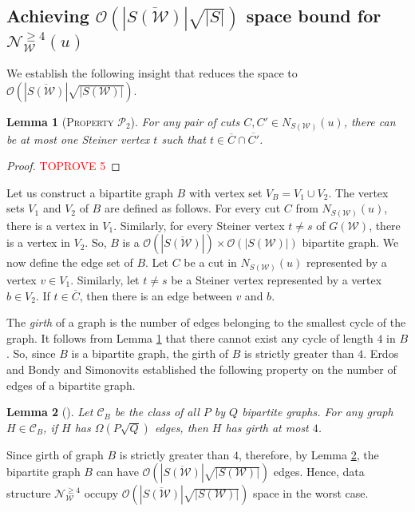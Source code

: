\documentclass[letterpaper,11pt]{article}
\newtheorem{lemma}{Lemma}[]
\begin{document}
\subsection{Achieving ${\mathcal O}(|\overline{S({\mathcal W})}|\sqrt{|S|})$ space bound for ${\mathcal N}_{\mathcal W}^{\ge 4}(u)$} \label{app : root S bound} 
We establish the following insight that reduces the space to ${\mathcal O}(|\overline{S({\mathcal W})}|\sqrt{|S({\mathcal W})|})$. 
\begin{lemma} [\textsc{Property ${\mathcal P}_2$}] \label{lem : at most one bunch in common}
    For any pair of cuts $C,C'\in N_{S({\mathcal W})}(u)$, there can be at most one Steiner vertex $t$ such that $t\in \overline{C} \cap \overline{C'}$.
\end{lemma}
\begin{proof}\textcolor{red}{TOPROVE 5}\end{proof}
Let us construct a bipartite graph $B$ with vertex set $V_B=V_1 \cup V_2$. The vertex sets $V_1$ and $V_2$ of $B$ are defined as follows. For every cut $C$ from $N_{S({\mathcal W})}(u)$, there is a vertex in $V_1$. Similarly, for every Steiner vertex $t\ne s$ of $G({\mathcal W})$, there is a vertex in $V_2$. So, $B$ is a ${\mathcal O}(|\overline{S({\mathcal W})}|) \times {\mathcal O}(|S({\mathcal W})|)$ bipartite graph. We now define the edge set of $B$. Let $C$ be a cut in $N_{S({\mathcal W})}(u)$ represented by a vertex $v\in V_1$. Similarly, let $t\ne s$ be a Steiner vertex represented by a vertex $b\in V_2$. If $t\in \overline{C}$, then there is an edge between $v$ and $b$.

The \textit{girth} of a graph is the number of edges belonging to the smallest cycle of the graph. It follows from Lemma \ref{lem : at most one bunch in common} that there cannot exist any cycle of length $4$ in $B$. So, since $B$ is a bipartite graph, the girth of $B$ is strictly greater than $4$. Erdos \cite{erdos1964extremal} and Bondy and Simonovits \cite{bondy1974cycles} established the following property on the number of edges of a bipartite graph. 
\begin{lemma} [\cite{erdos1964extremal, bondy1974cycles}] \label{lem : girth is 4}
    Let ${\mathcal C}_B$ be the class of all $P$ by $Q$ bipartite graphs. For any graph $H\in {\mathcal C}_B$, if $H$ has ${\Omega}(P\sqrt{Q})$ edges, then $H$ has girth at most $4$.    
\end{lemma}
Since girth of graph $B$ is strictly greater than $4$, therefore, by Lemma \ref{lem : girth is 4}, the bipartite graph $B$ can have ${\mathcal O}(|\overline{S({\mathcal W})}|\sqrt{|S({\mathcal W})|})$ edges. 
Hence, data structure ${\mathcal N}_{\mathcal W}^{\ge 4}$ occupy ${\mathcal O}(|\overline{S({\mathcal W})}|\sqrt{|S({\mathcal W})|})$ space in the worst case. 
\end{document}

